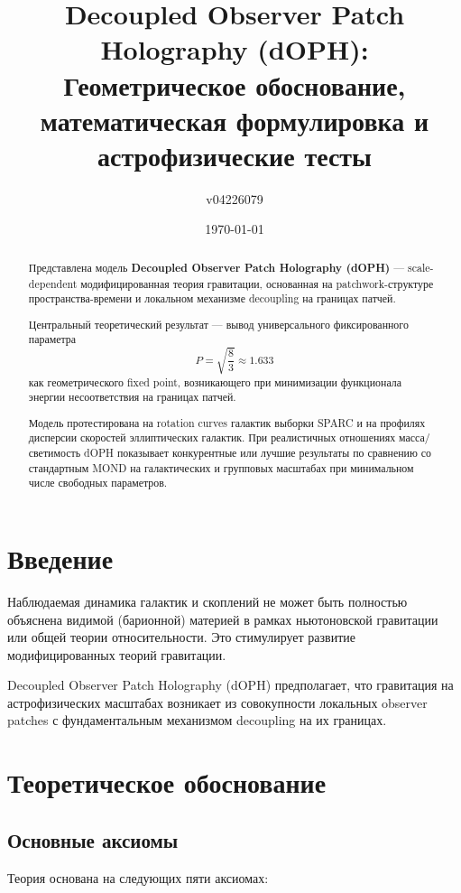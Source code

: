 \documentclass[12pt,a4paper]{article}
\title{Decoupled Observer Patch Holography (dOPH): \\
Геометрическое обоснование, математическая формулировка и астрофизические тесты}
\author{v04226079}
\date{\today}
\begin{document}
\maketitle

\begin{abstract}
Представлена модель \textbf{Decoupled Observer Patch Holography (dOPH)} — scale-dependent модифицированная теория гравитации, основанная на patchwork-структуре пространства-времени и локальном механизме decoupling на границах патчей.

Центральный теоретический результат — вывод универсального фиксированного параметра 
\[
P = \sqrt{\frac{8}{3}} \approx 1.633
\]
как геометрического fixed point, возникающего при минимизации функционала энергии несоответствия на границах патчей.

Модель протестирована на rotation curves галактик выборки SPARC и на профилях дисперсии скоростей эллиптических галактик. При реалистичных отношениях масса/светимость dOPH показывает конкурентные или лучшие результаты по сравнению со стандартным MOND на галактических и групповых масштабах при минимальном числе свободных параметров.
\end{abstract}

\section{Введение}

Наблюдаемая динамика галактик и скоплений не может быть полностью объяснена видимой (барионной) материей в рамках ньютоновской гравитации или общей теории относительности. Это стимулирует развитие модифицированных теорий гравитации.

Decoupled Observer Patch Holography (dOPH) предполагает, что гравитация на астрофизических масштабах возникает из совокупности локальных observer patches с фундаментальным механизмом decoupling на их границах.

\section{Теоретическое обоснование}

\subsection{Основные аксиомы}

Теория основана на следующих пяти аксиомах:
\end{document}
